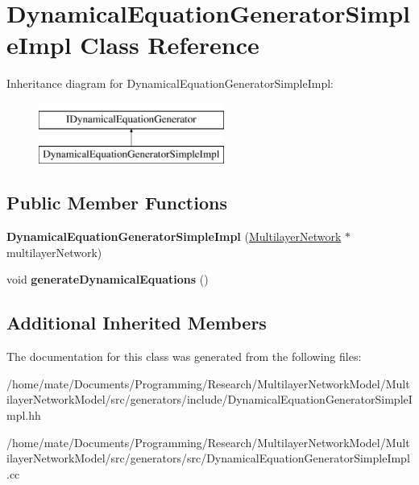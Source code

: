 \hypertarget{classDynamicalEquationGeneratorSimpleImpl}{}\section{Dynamical\+Equation\+Generator\+Simple\+Impl Class Reference}
\label{classDynamicalEquationGeneratorSimpleImpl}
Inheritance diagram for Dynamical\+Equation\+Generator\+Simple\+Impl\+:\begin{figure}[H]
\begin{center}
\leavevmode
\includegraphics[height=2.000000cm]{classDynamicalEquationGeneratorSimpleImpl}
\end{center}
\end{figure}
\subsection*{Public Member Functions}
\begin{DoxyCompactItemize}
\item 
{\bfseries Dynamical\+Equation\+Generator\+Simple\+Impl} (\hyperlink{classMultilayerNetwork}{Multilayer\+Network} $\ast$multilayer\+Network)\hypertarget{classDynamicalEquationGeneratorSimpleImpl_aefe26119d2db680f1a03fc0b5415474e}{}\label{classDynamicalEquationGeneratorSimpleImpl_aefe26119d2db680f1a03fc0b5415474e}

\item 
void {\bfseries generate\+Dynamical\+Equations} ()\hypertarget{classDynamicalEquationGeneratorSimpleImpl_a92e9bade614a29d3c5351d89d43e98f1}{}\label{classDynamicalEquationGeneratorSimpleImpl_a92e9bade614a29d3c5351d89d43e98f1}

\end{DoxyCompactItemize}
\subsection*{Additional Inherited Members}


The documentation for this class was generated from the following files\+:\begin{DoxyCompactItemize}
\item 
/home/mate/\+Documents/\+Programming/\+Research/\+Multilayer\+Network\+Model/\+Multilayer\+Network\+Model/src/generators/include/Dynamical\+Equation\+Generator\+Simple\+Impl.\+hh\item 
/home/mate/\+Documents/\+Programming/\+Research/\+Multilayer\+Network\+Model/\+Multilayer\+Network\+Model/src/generators/src/Dynamical\+Equation\+Generator\+Simple\+Impl.\+cc\end{DoxyCompactItemize}
